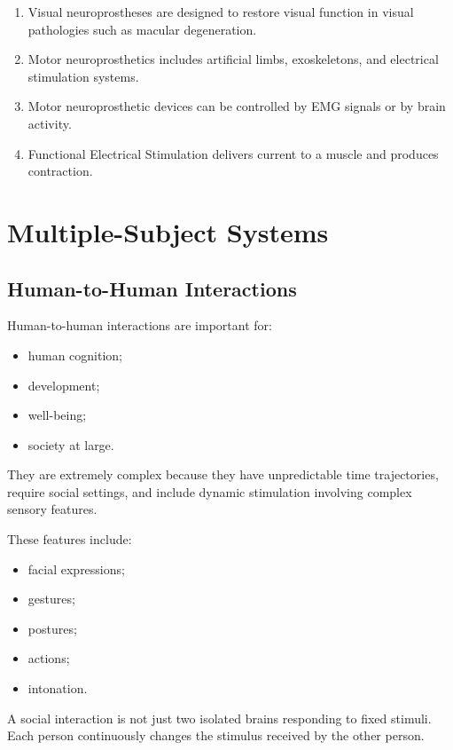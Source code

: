 \begin{enumerate}[label=\arabic*.]
    \item Visual neuroprostheses are designed to restore visual function in visual pathologies such as macular degeneration.
    
    \item Motor neuroprosthetics includes artificial limbs, exoskeletons, and electrical stimulation systems.
    
    \item Motor neuroprosthetic devices can be controlled by EMG signals or by brain activity.
    
    \item Functional Electrical Stimulation delivers current to a muscle and produces contraction.
\end{enumerate}

\section{Multiple-Subject Systems}

\subsection{Human-to-Human Interactions}

Human-to-human interactions are important for:

\begin{itemize}[noitemsep]
    \item human cognition;
    \item development;
    \item well-being;
    \item society at large.
\end{itemize}

They are extremely complex because they have unpredictable time trajectories, require social settings, and include dynamic stimulation involving complex sensory features.

These features include:

\begin{itemize}[noitemsep]
    \item facial expressions;
    \item gestures;
    \item postures;
    \item actions;
    \item intonation.
\end{itemize}

\begin{authornote}
A social interaction is not just two isolated brains responding to fixed stimuli. Each person continuously changes the stimulus received by the other person.
\end{authornote}


